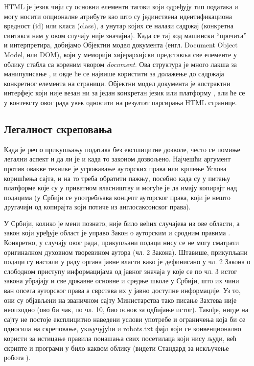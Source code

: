HTML је језик чији су основни елементи тагови који одређују тип података и могу носити опционалне атрибуте као што су јединствена идентификациона вредност (id) или класа (class), а унутар којих се налази садржај (конкретна синтакса нам у овом случају није значајна). Када се тај код машински \enquote{прочита} и интерпретира, добијамо Објектни модел документа (енгл. Document Object Model, или DOM), који у меморији хијерархијски представља све елементе у облику стабла са кореним чвором \emph{document}. Ова структура је много лакша за манипулисање \citep{gupta2003dom}, и овде ће се највише користити за долажење до садржаја конкретног елемента на страници. Објектни модел документа је апстрактни интерфејс који није везан ни за један конкретан језик или платформу \citep{w3domdef}, али ће се у контексту овог рада увек односити на резултат парсирања HTML странице.

\subsection{Легалност скреповања}

Када је реч о прикупљању података без експлицитне дозволе, често се помиње легални аспект и да ли је и када то законом дозвољено. Најчешћи аргумент против овакве технике је угрожавање ауторских права или кршење Услова коришћења сајта, и на то треба обратити пажњу, посебно када су у питању платформе које су у приватном власништву и могуће је да имају копирајт над подацима (у Србији се употребљава концепт ауторског права, који је нешто другачији од копирајта који потиче из англосаксонског права). 

У Србији, колико је мени познато, није било већих случајева из ове области, а закон који уређује област је управо Закон о ауторским и сродним правима \citep{autorskaprava}. Конкретно, у случају овог рада, прикупљани подаци нису се не могу сматрати оригиналном духовном творевином аутора (чл. 2 Закона). Штавише, прикупљани подаци су настали у раду органа јавне власти како је дефинисано у чл. 2 Закона о слободном приступу информацијама од јавног значаја \citep{zospi} у које се по чл. 3 истог закона убрајају и све државне основне и средње школе у Србији, што их чини ван опсега ауторског права а сврстава их у јавно доступне информације. Уз то, они су објављени на званичном сајту Министарства тако писање Захтева није неопходно (ово би чак, по чл. 10, био основ за одбијање истог). Такође, нигде на сајту не постоје експлицитно наведени услови употребе и ограничења која би се односила на скреповање, укључујући и robots.txt фајл који се конвенционално користи за истицање правила понашања свих посетилаца који нису људи, већ скрипте и програми у било каквом облику (видети Стандард за искључење робота \citep{robotstxt}).

